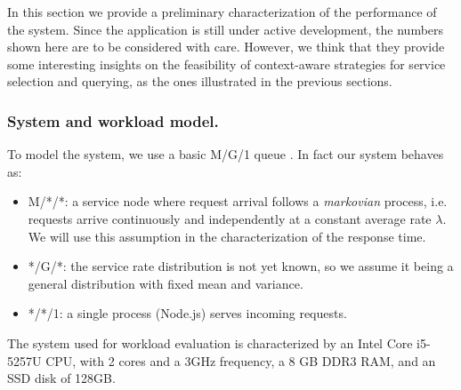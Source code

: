 \label{subsec:evaluation}

In this section we provide a preliminary characterization of the performance of the system.
Since the application is still under active development, the numbers shown here
are to be considered with care. However, we think that they provide some interesting insights on the feasibility of context-aware strategies for service selection and querying, as the ones illustrated in the previous sections. 

\subsubsection{System and workload model.}
To model the system, we use a basic M/G/1 queue \cite{sundarapandian2009probability}. In fact
our system behaves as:

\begin{itemize}
\item M/*/*: a service node where request arrival follows a \emph{markovian}
process, i.e. requests arrive continuously and independently at a
constant average rate $\lambda$. We will use this assumption in the
characterization of the response time.

\item */G/*: the service rate distribution is not yet known, so we assume it being a
general distribution with fixed mean and variance.

\item */*/1: a single process (Node.js) serves incoming requests.
\end{itemize}

The system used for  workload evaluation is characterized by an Intel Core i5-5257U CPU, with 2 cores and a 3GHz frequency, a 8 GB DDR3 RAM, and an SSD disk of 128GB.  




